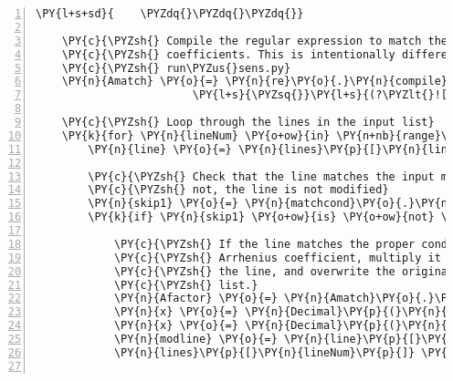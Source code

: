 \begin{Verbatim}[commandchars=\\\{\},fontsize=\small,numbers=left,firstnumber=1,stepnumber=2,firstline=2]
\PY{l+s+sd}{    \PYZdq{}\PYZdq{}\PYZdq{}}

    \PY{c}{\PYZsh{} Compile the regular expression to match the Arrhenius}
    \PY{c}{\PYZsh{} coefficients. This is intentionally different from the Amatch in}
    \PY{c}{\PYZsh{} run\PYZus{}sens.py}
    \PY{n}{Amatch} \PY{o}{=} \PY{n}{re}\PY{o}{.}\PY{n}{compile}\PY{p}{(}\PY{l+s}{r\PYZsq{}}\PY{l+s}{(([\PYZhy{}+]?[0\PYZhy{}9]+(}\PY{l+s}{\PYZbs{}}\PY{l+s}{.[0\PYZhy{}9]+)?[eE][\PYZhy{}+]?[0\PYZhy{}9]+)|}\PY{l+s}{\PYZsq{}}
                        \PY{l+s}{\PYZsq{}}\PY{l+s}{(?\PYZlt{}![}\PY{l+s}{\PYZbs{}}\PY{l+s}{d}\PY{l+s}{\PYZbs{}}\PY{l+s}{.])([0]+}\PY{l+s}{\PYZbs{}}\PY{l+s}{.?[0]+)(?![}\PY{l+s}{\PYZbs{}}\PY{l+s}{d]))}\PY{l+s}{\PYZsq{}}\PY{p}{)}

    \PY{c}{\PYZsh{} Loop through the lines in the input list}
    \PY{k}{for} \PY{n}{lineNum} \PY{o+ow}{in} \PY{n+nb}{range}\PY{p}{(}\PY{n+nb}{len}\PY{p}{(}\PY{n}{lines}\PY{p}{)}\PY{p}{)}\PY{p}{:}
        \PY{n}{line} \PY{o}{=} \PY{n}{lines}\PY{p}{[}\PY{n}{lineNum}\PY{p}{]}

        \PY{c}{\PYZsh{} Check that the line matches the input matching condition. If}
        \PY{c}{\PYZsh{} not, the line is not modified}
        \PY{n}{skip1} \PY{o}{=} \PY{n}{matchcond}\PY{o}{.}\PY{n}{search}\PY{p}{(}\PY{n}{line}\PY{p}{)}
        \PY{k}{if} \PY{n}{skip1} \PY{o+ow}{is} \PY{o+ow}{not} \PY{n+nb+bp}{None}\PY{p}{:}

            \PY{c}{\PYZsh{} If the line matches the proper condition, find the}
            \PY{c}{\PYZsh{} Arrhenius coefficient, multiply it by two, reconstruct}
            \PY{c}{\PYZsh{} the line, and overwrite the original line in the input}
            \PY{c}{\PYZsh{} list.}
            \PY{n}{Afactor} \PY{o}{=} \PY{n}{Amatch}\PY{o}{.}\PY{n}{search}\PY{p}{(}\PY{n}{line}\PY{p}{)}
            \PY{n}{x} \PY{o}{=} \PY{n}{Decimal}\PY{p}{(}\PY{n}{Afactor}\PY{o}{.}\PY{n}{group}\PY{p}{(}\PY{l+m+mi}{1}\PY{p}{)}\PY{p}{)}
            \PY{n}{x} \PY{o}{=} \PY{n}{Decimal}\PY{p}{(}\PY{n}{rfac}\PY{p}{)} \PY{o}{*} \PY{n}{x}
            \PY{n}{modline} \PY{o}{=} \PY{n}{line}\PY{p}{[}\PY{p}{:}\PY{n}{Afactor}\PY{o}{.}\PY{n}{start}\PY{p}{(}\PY{p}{)}\PY{p}{]} \PY{o}{+} \PY{n+nb}{str}\PY{p}{(}\PY{n}{x}\PY{p}{)} \PY{o}{+} \PY{n}{line}\PY{p}{[}\PY{n}{Afactor}\PY{o}{.}\PY{n}{end}\PY{p}{(}\PY{p}{)}\PY{p}{:}\PY{p}{]}
            \PY{n}{lines}\PY{p}{[}\PY{n}{lineNum}\PY{p}{]} \PY{o}{=} \PY{n}{modline}


\end{Verbatim}
